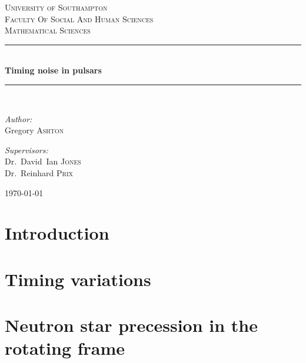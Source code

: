 \documentclass[twoside]{thesis}
\begin{document}
\def\biblio{}

\begin{titlepage}
\newcommand{\HRule}{\rule{\linewidth}{0.5mm}}
\begin{center}

\textsc{\LARGE University of Southampton}\\[0.2cm]
\textsc{\Large Faculty Of Social And Human Sciences}\\[0.2cm]
\textsc{\Large Mathematical Sciences}\\[1.5cm]

\HRule \\[0.4cm]
{ \huge \bfseries Timing noise in pulsars \\[0.4cm] }

\HRule \\[1.5cm]

\noindent
\begin{minipage}{0.4\textwidth}
\begin{flushleft} \large
\emph{Author:}\\
Gregory \textsc{Ashton}
\end{flushleft}
\end{minipage}%
\begin{minipage}{0.4\textwidth}
\begin{flushright} \large
\emph{Supervisors:} \\
Dr.~David~Ian \textsc{Jones} \\
Dr.~Reinhard \textsc{Prix}
\end{flushright}
\end{minipage}

\vfill

{\large \today}
\end{center}
\end{titlepage}

\tableofcontents

\chapter{Introduction}
\label{sec: neutron star physics}


\chapter{Timing variations}
\label{sec: timing variations}


\chapter{Neutron star precession in the rotating frame}
\label{sec: rotating frame}

\end{document}
